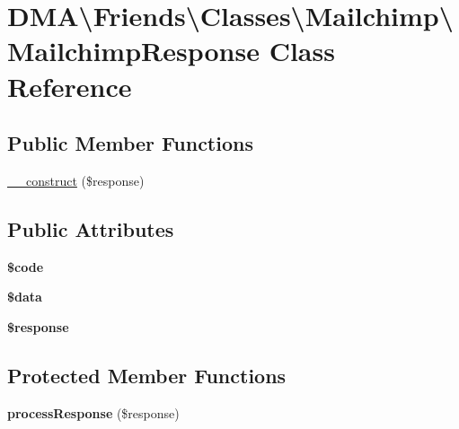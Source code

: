 \hypertarget{classDMA_1_1Friends_1_1Classes_1_1Mailchimp_1_1MailchimpResponse}{}\section{D\+M\+A\textbackslash{}Friends\textbackslash{}Classes\textbackslash{}Mailchimp\textbackslash{}Mailchimp\+Response Class Reference}
\label{classDMA_1_1Friends_1_1Classes_1_1Mailchimp_1_1MailchimpResponse}
\subsection*{Public Member Functions}
\begin{DoxyCompactItemize}
\item 
\hyperlink{classDMA_1_1Friends_1_1Classes_1_1Mailchimp_1_1MailchimpResponse_a54bfff171b43ab6a8ad05d745a2bdbf7}{\+\_\+\+\_\+construct} (\$response)
\end{DoxyCompactItemize}
\subsection*{Public Attributes}
\begin{DoxyCompactItemize}
\item 
\hypertarget{classDMA_1_1Friends_1_1Classes_1_1Mailchimp_1_1MailchimpResponse_a03ff3dbdadc1980ee12a11e7b60c660f}{}{\bfseries \$code}\label{classDMA_1_1Friends_1_1Classes_1_1Mailchimp_1_1MailchimpResponse_a03ff3dbdadc1980ee12a11e7b60c660f}

\item 
\hypertarget{classDMA_1_1Friends_1_1Classes_1_1Mailchimp_1_1MailchimpResponse_a3a5101f168d90844b7f65e6ba8781772}{}{\bfseries \$data}\label{classDMA_1_1Friends_1_1Classes_1_1Mailchimp_1_1MailchimpResponse_a3a5101f168d90844b7f65e6ba8781772}

\item 
\hypertarget{classDMA_1_1Friends_1_1Classes_1_1Mailchimp_1_1MailchimpResponse_acef5eaffd68cfdc72946feeefc8159e4}{}{\bfseries \$response}\label{classDMA_1_1Friends_1_1Classes_1_1Mailchimp_1_1MailchimpResponse_acef5eaffd68cfdc72946feeefc8159e4}

\end{DoxyCompactItemize}
\subsection*{Protected Member Functions}
\begin{DoxyCompactItemize}
\item 
\hypertarget{classDMA_1_1Friends_1_1Classes_1_1Mailchimp_1_1MailchimpResponse_a56f1016aed97edb9392fac811bb3cb57}{}{\bfseries process\+Response} (\$response)\label{classDMA_1_1Friends_1_1Classes_1_1Mailchimp_1_1MailchimpResponse_a56f1016aed97edb9392fac811bb3cb57}

\end{DoxyCompactItemize}


